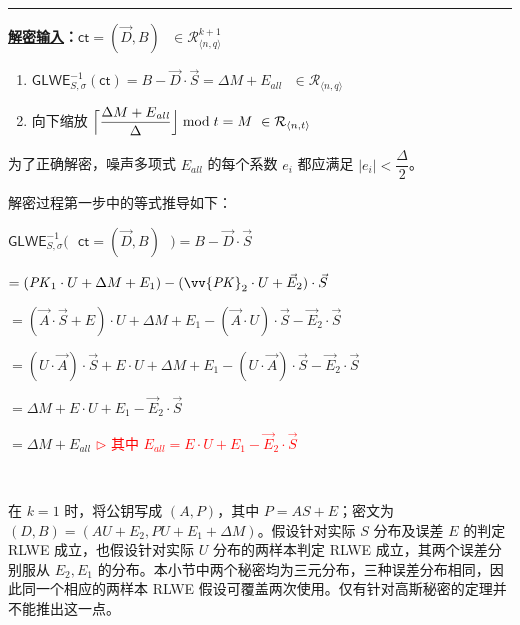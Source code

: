 \begin{tcolorbox}[title={\textbf{\tboxlabel{\ref*{subsec:glwe-public-key-enc}} RLWE 公钥加密（$k=1$）}}]
\begin{enumerate}
\end{enumerate}


\par\noindent\rule{\textwidth}{0.4pt}

\textbf{\underline{解密输入}：}$\textsf{ct} = (\vec{D}, B) \text{ } \in \mathcal{R}_{\langle n,q \rangle}^{k + 1}$

\begin{enumerate}
\item $\textsf{GLWE}^{-1}_{S,\sigma}(\textsf{ct}) = B - \vec{D} \cdot \vec{S} = \Delta  M + E_{\mathit{all}} \text{ } \in \mathcal{R}_{\langle n,q \rangle}$

\item 向下缩放
$\Bigl\lceil \dfrac{ \Delta  M + E_{\mathit{all}} }{\Delta}\Bigr\rfloor \bmod t = M  \text{ } \in \mathcal{R}_{\langle n, t \rangle}$

\end{enumerate}

为了正确解密，噪声多项式 $E_{\mathit{all}}$ 的每个系数 $e_i$ 都应满足 $|e_i| < \dfrac{\Delta}{2}$。

\end{tcolorbox}


解密过程第一步中的等式推导如下：

$\textsf{GLWE}^{-1}_{S,\sigma}\bm{(}\text{ } \textsf{ct} = (\vec{D}, B) \text{ }\bm{)} = B - \vec{D}\cdot\vec{S}$

$ = (\mathit{PK}_1\cdot U + \Delta  M + E_1) - (\vv{\mathit{PK}}_2 \cdot U + \vec{E}_2)\cdot \vec{S} $

$=  (\vec{A} \cdot \vec{S} + E)\cdot U + \Delta M + E_1 - (\vec{A}\cdot U)\cdot \vec{S} - \vec{E}_2\cdot\vec{S}$

$=  (U\cdot\vec{A}) \cdot \vec{S} + E \cdot U + \Delta M + E_1 - (U\cdot \vec{A}) \cdot \vec{S} - \vec{E}_2\cdot\vec{S}$

$= \Delta M + E \cdot U + E_1 - \vec{E}_2\cdot\vec{S}$

$= \Delta M + E_{\mathit{all}}$ \textcolor{red}{ $\rhd$ 其中 $E_{\mathit{all}} = E \cdot U + E_1 - \vec{E}_2\cdot\vec{S}$}


$ $

在 $k=1$ 时，将公钥写成 $(A,P)$，其中 $P=AS+E$；密文为 $(D,B)=(AU+E_2,PU+E_1+\Delta M)$。假设针对实际 $S$ 分布及误差 $E$ 的判定 RLWE 成立，也假设针对实际 $U$ 分布的两样本判定 RLWE 成立，其两个误差分别服从 $E_2,E_1$ 的分布。本小节中两个秘密均为三元分布，三种误差分布相同，因此同一个相应的两样本 RLWE 假设可覆盖两次使用。仅有针对高斯秘密的定理并不能推出这一点。

